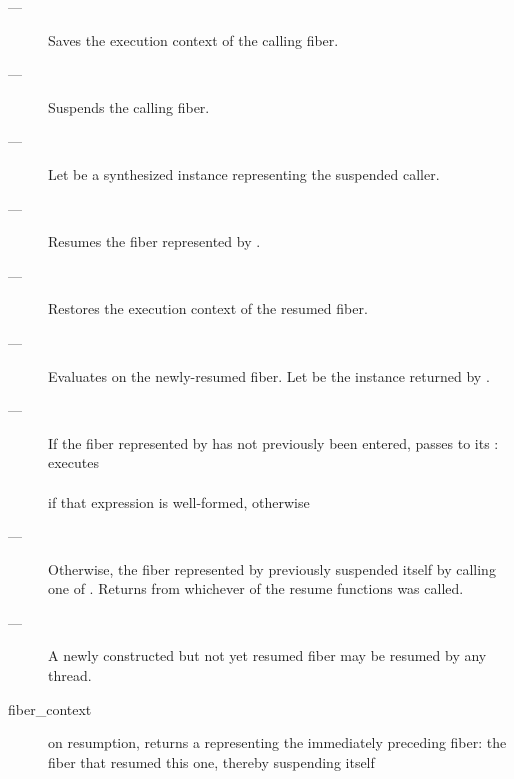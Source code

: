 \effects
\begin{description}
    \item[---] Saves the execution context of the calling fiber.
    \item[---] Suspends the calling fiber.
    \item[---] Let  be a synthesized \fiber instance representing
               the suspended caller.
    \item[---] Resumes the fiber represented by .
    \item[---] Restores the execution context of the resumed fiber.
    \item[---] Evaluates 
               on the newly-resumed fiber.
               Let  be the \fiber instance returned by .
    \item[---] If the fiber represented by  has not previously been
               entered, passes  to its \entryfn: executes\\
               \\
               if that expression is well-formed, otherwise\\
    \item[---] Otherwise, the fiber represented by  previously
               suspended itself by calling one of \allresume.
               Returns  from whichever of the resume functions
               was called.
\end{description}

\remarks
\begin{description}
    \item[---] A newly constructed but not yet resumed fiber may be resumed by
              any thread.
\end{description}

\returns
\begin{description}
    \item[fiber\_context] on resumption, \resumewith returns a \fiber
               representing the immediately preceding fiber: the fiber that
               resumed this one, thereby suspending itself
\end{description}


